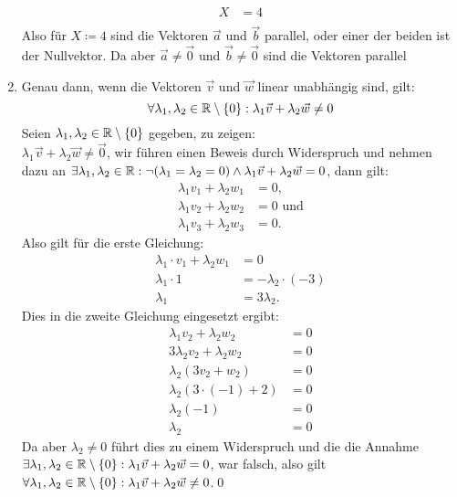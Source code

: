 \documentclass[sectionformat = aufgabe]{gadsescript}
\begin{document}
\begin{enumerate}[label=\alph*)]
\begin{align*}
			X &= 4\\
		\end{align*}
		Also für $ X \coloneqq 4 $ sind die Vektoren $\vec a $ und $ \vec b $ parallel, oder einer der beiden ist der Nullvektor. Da aber $ \vec a \neq \vec0 $ und $ \vec b \neq \vec0 $ sind die Vektoren parallel
	\item Genau dann, wenn die Vektoren $ \vec v $ und $ \vec w $ linear unabhängig sind, gilt:
		\[ \forall \lambda_1,\lambda_2 \in \mathbb{R}\setminus\{0\} : \lambda_1\vec v + \lambda_2\vec w \neq 0 \]
		Seien $ \lambda_1, \lambda_2 \in \mathbb{R}\setminus\{0\} $ gegeben, zu zeigen:\\
		$\lambda_1 \vec v + \lambda_2 \vec w \neq \vec 0 $, wir führen einen Beweis durch Widerspruch und nehmen dazu an $ \exists\lambda_1,\lambda_2\in\mathbb{R}:\neg(\lambda_1=\lambda_2=0)\wedge\lambda_1\vec v+\lambda_2\vec w = 0$, dann gilt:
		\begin{align*}
			\lambda_1v_1 + \lambda_2w_1 &= 0,\\
			\lambda_1v_2 + \lambda_2w_2 &= 0 \text{ und}\\
			\lambda_1v_3 + \lambda_2w_3 &= 0.
		\end{align*}
		Also gilt für die erste Gleichung:
		\begin{align*}
			\lambda_1\cdot v_1 + \lambda_2w_1 &= 0\\
			\lambda_1 \cdot 1 &= -\lambda_2\cdot (-3)\\
			\lambda_1 &= 3\lambda_2.
		\end{align*}
		Dies in die zweite Gleichung eingesetzt ergibt:
		\begin{align*}
			\lambda_1v_2 + \lambda_2w_2 &= 0 \\
			3\lambda_2v_2 + \lambda_2w_2 &= 0 \\
			\lambda_2\left(3v_2 + w_2\right) &= 0 \\
			\lambda_2\left(3 \cdot (-1) + 2\right) &= 0 \\
			\lambda_2\left(-1\right) &= 0 \\
			\lambda_2 &= 0
		\end{align*}
		Da aber $ \lambda_2 \neq 0 $ führt dies zu einem Widerspruch und die die Annahme $ \exists\lambda_1,\lambda_2\in\mathbb{R}\setminus\{0\}:\lambda_1\vec v+\lambda_2\vec w = 0$, war falsch, also gilt $\forall \lambda_1,\lambda_2 \in \mathbb{R}\setminus\{0\} : \lambda_1\vec v + \lambda_2\vec w \neq 0 $.\qed
\end{enumerate}
\end{document}
